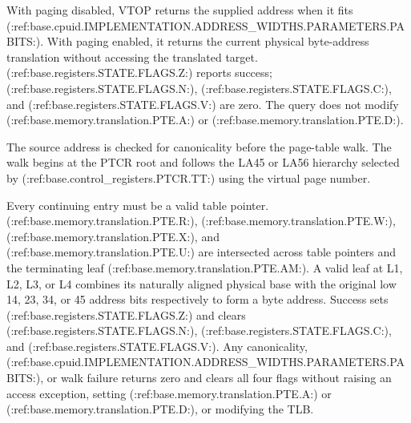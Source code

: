 With paging disabled, VTOP returns the supplied address when it fits (:ref:base.cpuid.IMPLEMENTATION.ADDRESS_WIDTHS.PARAMETERS.PABITS:). With paging enabled, it returns the current physical byte-address translation without accessing the translated target. (:ref:base.registers.STATE.FLAGS.Z:) reports success; (:ref:base.registers.STATE.FLAGS.N:), (:ref:base.registers.STATE.FLAGS.C:), and (:ref:base.registers.STATE.FLAGS.V:) are zero. The query does not modify (:ref:base.memory.translation.PTE.A:) or (:ref:base.memory.translation.PTE.D:).

The source address is checked for canonicality before the page-table walk. The walk begins at the PTCR root and follows the LA45 or LA56 hierarchy selected by (:ref:base.control_registers.PTCR.TT:) using the virtual page number.

Every continuing entry must be a valid table pointer. (:ref:base.memory.translation.PTE.R:), (:ref:base.memory.translation.PTE.W:), (:ref:base.memory.translation.PTE.X:), and (:ref:base.memory.translation.PTE.U:) are intersected across table pointers and the terminating leaf (:ref:base.memory.translation.PTE.AM:). A valid leaf at L1, L2, L3, or L4 combines its naturally aligned physical base with the original low 14, 23, 34, or 45 address bits respectively to form a byte address. Success sets (:ref:base.registers.STATE.FLAGS.Z:) and clears (:ref:base.registers.STATE.FLAGS.N:), (:ref:base.registers.STATE.FLAGS.C:), and (:ref:base.registers.STATE.FLAGS.V:). Any canonicality, (:ref:base.cpuid.IMPLEMENTATION.ADDRESS_WIDTHS.PARAMETERS.PABITS:), or walk failure returns zero and clears all four flags without raising an access exception, setting (:ref:base.memory.translation.PTE.A:) or (:ref:base.memory.translation.PTE.D:), or modifying the TLB.

